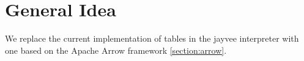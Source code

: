 %
%
%
%
%
%
%
%

\section{General Idea}
\label{section:General Idea}

We replace the current implementation of tables in the jayvee interpreter with one based on the Apache Arrow framework \ref{section:arrow}.


